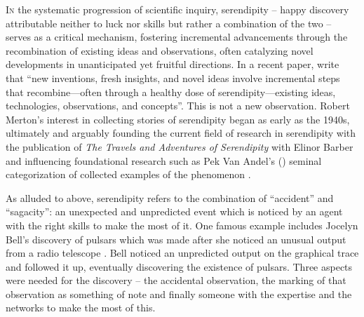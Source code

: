\documentclass[authordate, empirical]{jote-new-article}
\author[1]{\mbox{Wendy Ross}}
\affil[1]{London Metropolitan \mbox{University}}
\author[2]{\mbox{Samantha Copeland\orcid{0000-0002-6946-7165}}}
\affil[2]{Delft University \mbox{of Technology}}
\author[3]{\mbox{Stuart Firestein\orcid{0000-0003-1774-5853}}}
\affil[3]{Columbia University}
\begin{document}
\begin{frontmatter}
  \maketitle
  \begin{abstract}
    \printabstracttext
  \end{abstract}
\end{frontmatter}


	\lettrine{I}{n} the systematic progression of scientific inquiry, serendipity -- happy discovery attributable neither to luck nor skills but rather a combination of the two -- serves as a critical mechanism, fostering incremental advancements through the recombination of existing ideas and observations, often catalyzing novel developments in unanticipated yet fruitful directions. In a recent paper, \textcites[][p. 2]{Henrich2023} write that “new inventions, fresh insights, and novel ideas involve incremental steps that recombine—often through a healthy dose of serendipity—existing ideas, technologies, observations, and concepts”. This is not a new observation. Robert Merton's interest in collecting stories of serendipity began as early as the 1940s, ultimately and arguably founding the current field of research in serendipity with the publication of \emph{The Travels and Adventures of Serendipity }with Elinor Barber \parencites{Merton2004}{Yaqub2018} and influencing foundational research such as Pek Van Andel's (\hspace*{-2pt}\cite*{VanAndel1994}) seminal categorization of collected examples of the phenomenon \parencites{foster2003serendipity}.



	As alluded to above, serendipity refers to the combination of “accident” and “sagacity”: an unexpected and unpredicted event which is noticed by an agent with the right skills to make the most of it. One famous example includes Jocelyn Bell's discovery of pulsars which was made after she noticed an unusual output from a radio telescope \parencites{Arfini2023}. Bell noticed an unpredicted output on the graphical trace and followed it up, eventually discovering the existence of pulsars. Three aspects were needed for the discovery -- the accidental observation, the marking of that observation as something of note and finally someone with the expertise and the networks to make the most of this.
\end{document}
